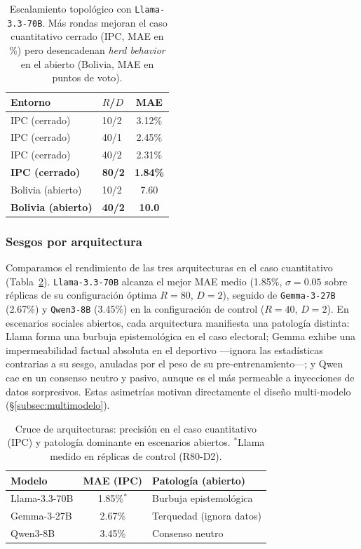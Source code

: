 \documentclass[11pt]{article}
\begin{document}
\begin{table}[t]
\centering
\small
\begin{tabular}{@{}llc@{}}
\toprule
\textbf{Entorno} & \textbf{$R$/$D$} & \textbf{MAE} \\
\midrule
IPC (cerrado) & 10/2 & 3.12\% \\
IPC (cerrado) & 40/1 & 2.45\% \\
IPC (cerrado) & 40/2 & 2.31\% \\
\textbf{IPC (cerrado)} & \textbf{80/2} & \textbf{1.84\%} \\
\midrule
Bolivia (abierto) & 10/2 & 7.60 \\
\textbf{Bolivia (abierto)} & \textbf{40/2} & \textbf{10.0} \\
\bottomrule
\end{tabular}
\caption{Escalamiento topológico con \texttt{Llama-3.3-70B}. Más rondas mejoran el caso cuantitativo cerrado (IPC, MAE en \%) pero desencadenan \textit{herd behavior} en el abierto (Bolivia, MAE en puntos de voto).}
\label{tab:topologia}
\end{table}

\subsubsection{Sesgos por arquitectura}

Comparamos el rendimiento de las tres arquitecturas en el caso cuantitativo (Tabla~\ref{tab:arquitecturas}). \texttt{Llama-3.3-70B} alcanza el mejor MAE medio (1.85\%, $\sigma=0.05$ sobre réplicas de su configuración óptima $R=80$, $D=2$), seguido de \texttt{Gemma-3-27B} (2.67\%) y \texttt{Qwen3-8B} (3.45\%) en la configuración de control ($R=40$, $D=2$). En escenarios sociales abiertos, cada arquitectura manifiesta una patología distinta: Llama forma una burbuja epistemológica en el caso electoral; Gemma exhibe una impermeabilidad factual absoluta en el deportivo —ignora las estadísticas contrarias a su sesgo, anuladas por el peso de su pre-entrenamiento—; y Qwen cae en un consenso neutro y pasivo, aunque es el más permeable a inyecciones de datos sorpresivos. Estas asimetrías motivan directamente el diseño multi-modelo (§\ref{subsec:multimodelo}).

\begin{table}[t]
\centering
\small
\begin{tabular}{@{}lcl@{}}
\toprule
\textbf{Modelo} & \textbf{MAE (IPC)} & \textbf{Patología (abierto)} \\
\midrule
Llama-3.3-70B & 1.85\%$^{*}$ & Burbuja epistemológica \\
Gemma-3-27B & 2.67\% & Terquedad (ignora datos) \\
Qwen3-8B & 3.45\% & Consenso neutro \\
\bottomrule
\end{tabular}
\caption{Cruce de arquitecturas: precisión en el caso cuantitativo (IPC) y patología dominante en escenarios abiertos. $^{*}$Llama medido en réplicas de control (R80-D2).}
\label{tab:arquitecturas}
\end{table}
\end{document}
